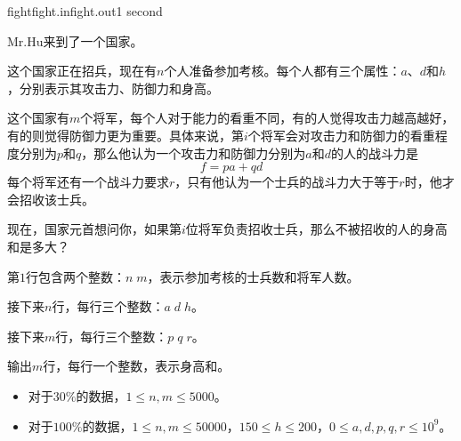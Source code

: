 \documentclass[11pt,a4paper,oneside]{article}
\begin{document}
\begin{problem}{fight}{fight.in}{fight.out}{1 second} 

    Mr.Hu来到了一个国家。
    
    这个国家正在招兵，现在有$n$个人准备参加考核。每个人都有三个属性：$a$、$d$和$h$，分别表示其攻击力、防御力和身高。
    
    这个国家有$m$个将军，每个人对于能力的看重不同，有的人觉得攻击力越高越好，有的则觉得防御力更为重要。具体来说，第$i$个将军会对攻击力和防御力的看重程度分别为$p$和$q$，那么他认为一个攻击力和防御力分别为$a$和$d$的人的战斗力是
    $$
	    f = pa + qd
    $$
    每个将军还有一个战斗力要求$r$，只有他认为一个士兵的战斗力大于等于$r$时，他才会招收该士兵。
    
    现在，国家元首想问你，如果第$i$位将军负责招收士兵，那么不被招收的人的身高和是多大？
    
    \InputFile

	第$1$行包含两个整数：$n \; m$，表示参加考核的士兵数和将军人数。
	
	接下来$n$行，每行三个整数：$a \; d \; h$。
	
	接下来$m$行，每行三个整数：$p \; q \; r$。
 
    \OutputFile

	输出$m$行，每行一个整数，表示身高和。
  
    \Example

    \begin{example}
    \end{example}

    \Note
    
    \begin{itemize}
		\item 对于$30\%$的数据，$1 \leq n, m \leq 5000$。
		\item 对于$100\%$的数据，$1 \leq n, m \leq 50000$，$150 \leq h \leq 200$，$0 \leq a, d, p, q, r \leq 10^9$。
    \end{itemize}

\end{problem}
\end{document}
